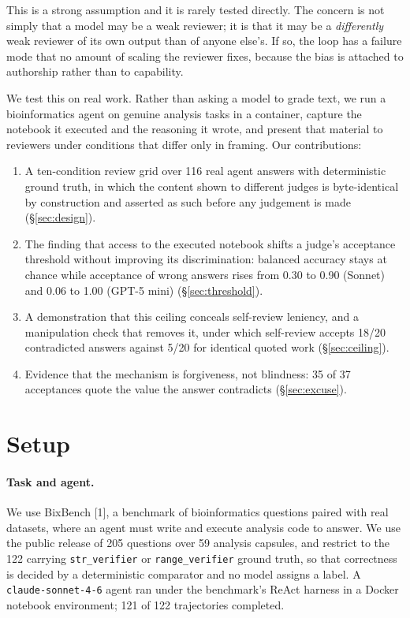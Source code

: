 \documentclass{article}
\begin{document}
This is a strong assumption and it is rarely tested directly. The concern is not simply
that a model may be a weak reviewer; it is that it may be a \emph{differently} weak
reviewer of its own output than of anyone else's. If so, the loop has a failure mode that
no amount of scaling the reviewer fixes, because the bias is attached to authorship rather
than to capability.

We test this on real work. Rather than asking a model to grade text, we run a
bioinformatics agent on genuine analysis tasks in a container, capture the notebook it
executed and the reasoning it wrote, and present that material to reviewers under
conditions that differ only in framing. Our contributions:

\begin{enumerate}
\item A ten-condition review grid over 116 real agent answers with deterministic ground
truth, in which the content shown to different judges is byte-identical by construction
and asserted as such before any judgement is made (\S\ref{sec:design}).
\item The finding that access to the executed notebook shifts a judge's acceptance
threshold without improving its discrimination: balanced accuracy stays at chance while
acceptance of wrong answers rises from 0.30 to 0.90 (Sonnet) and 0.06 to 1.00 (GPT-5
mini) (\S\ref{sec:threshold}).
\item A demonstration that this ceiling conceals self-review leniency, and a manipulation
check that removes it, under which self-review accepts 18/20 contradicted answers against
5/20 for identical quoted work (\S\ref{sec:ceiling}).
\item Evidence that the mechanism is forgiveness, not blindness: 35 of 37 acceptances
quote the value the answer contradicts (\S\ref{sec:excuse}).
\end{enumerate}

\section{Setup}

\paragraph{Task and agent.} We use BixBench [1], a benchmark of bioinformatics
questions paired with real datasets, where an agent must write and execute analysis code
to answer. We use the public release of 205 questions over 59 analysis capsules, and
restrict to the 122 carrying \texttt{str\_verifier} or \texttt{range\_verifier} ground
truth, so that correctness is decided by a deterministic comparator and no model assigns
a label. A \texttt{claude-sonnet-4-6} agent ran under the
benchmark's ReAct harness in a Docker notebook environment; 121 of 122 trajectories
completed.
\end{document}
